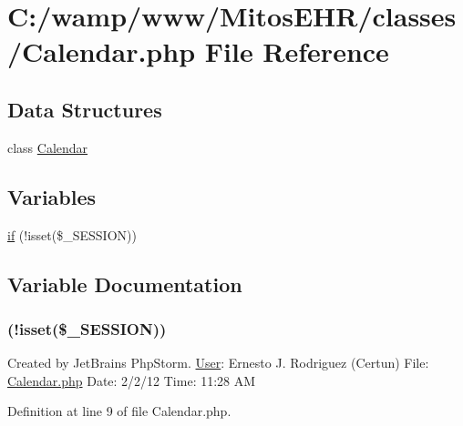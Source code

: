 \hypertarget{_calendar_8php}{\section{\-C\-:/wamp/www/\-Mitos\-E\-H\-R/classes/\-Calendar.php \-File \-Reference}
\label{_calendar_8php}
}
\subsection*{\-Data \-Structures}
\begin{DoxyCompactItemize}
\item 
class \hyperlink{class_calendar}{\-Calendar}
\end{DoxyCompactItemize}
\subsection*{\-Variables}
\begin{DoxyCompactItemize}
\item 
\hyperlink{_calendar_8php_a8ceca98aa29914fd2479a84a8d2242fb}{if} (!isset(\$\-\_\-\-S\-E\-S\-S\-I\-O\-N))
\end{DoxyCompactItemize}


\subsection{\-Variable \-Documentation}
\hypertarget{_calendar_8php_a8ceca98aa29914fd2479a84a8d2242fb}{
\subsubsection[{if}]{(!isset(\$\-\_\-\-S\-E\-S\-S\-I\-O\-N))}}\label{_calendar_8php_a8ceca98aa29914fd2479a84a8d2242fb}
\-Created by \-Jet\-Brains \-Php\-Storm. \hyperlink{class_user}{\-User}\-: \-Ernesto \-J. \-Rodriguez (\-Certun) \-File\-: \hyperlink{_calendar_8php}{\-Calendar.\-php} \-Date\-: 2/2/12 \-Time\-: 11\-:28 \-A\-M 

\-Definition at line 9 of file \-Calendar.\-php.

